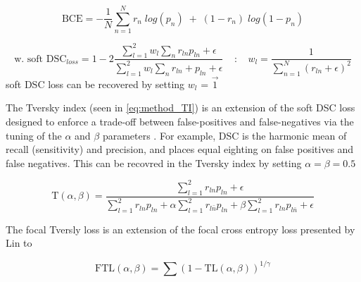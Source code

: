 
%
%
%
%
\begin{equation}
\textrm{BCE} = -\frac{1}{N}\sum_{n=1}^{N}r_{n} \; log(p_{n}) \; + \; (1-r_{n}) \; log(1-p_{n})
\label{eq:method_bce}
\end{equation}


\begin{equation}
\textrm{w. soft DSC$_{loss}$} = 1-2\frac{\sum_{l=1}^{2}w_{l}\sum_{n}r_{ln}p_{ln} + \epsilon}{\sum_{l=1}^{2}w_{l}\sum_{n}r_{ln} + p_{ln} + \epsilon} \; \;  \; \; \textbf{:} \; \; \; \; w_{l} = \frac{1}{\sum_{n=1}^{N}(r_{ln} + \epsilon)^2}
\label{eq:method_wsdsc}
\end{equation}
%
soft DSC loss can be recovered by setting $w_{l}$ = $\vec{1}$

The Tversky index (seen in \ref{eq:method_TI}) is an extension of the soft DSC loss designed to enforce a trade-off between false-positives and false-negatives via the tuning of the $\alpha$ and $\beta$ parameters \cite{Khan2019}. For example, DSC is the harmonic mean of recall (sensitivity) and precision, and places equal eighting on false positives and false negatives. This can be recovred in the Tversky index by setting $\alpha = \beta = 0.5$

\begin{equation}
\textrm{T}(\alpha, \beta) = \frac{\sum_{l=1}^{2}r_{ln}p_{ln} + \epsilon}{
\sum_{l=1}^{2}r_{ln}p_{ln} +
\alpha\sum_{l=1}^{2}r_{l\bar{n}}p_{ln} +
\beta\sum_{l=1}^{2}r_{ln}p_{l\bar{n}} + \epsilon	
}
\label{eq:method_TI}
\end{equation}

The focal Tversly loss is an extension of the focal cross entropy loss presented by Lin to 

\begin{equation}
\textrm{FTL}(\alpha, \beta) = \sum(1-\textrm{TL}(\alpha, \beta))^{1 / \gamma}
\label{eq:method_TL}
\end{equation}
